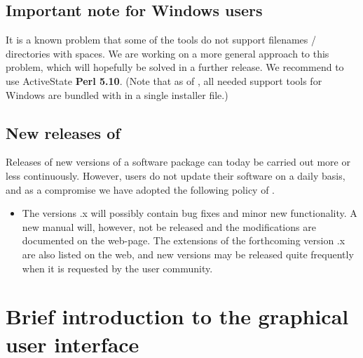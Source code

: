 \subsection{Important note for Windows users} 
It is a known problem that some of
the \MCS tools do not support filenames / directories with spaces.
We are working on a more general approach to this problem, which will
hopefully be solved in a further release. We recommend to use
ActiveState \textbf{Perl 5.10}. (Note that as of , all needed
support tools for Windows are bundled with \MCS in a single installer file.)

\subsection{New releases of \MCS}

Releases of new versions of a software package can today be carried out more or
less continuously. However, users do not update their software on a daily basis,
and as a compromise we have adopted the following policy of \MCS .

\begin{itemize}
\item The versions {\version}.x will possibly contain bug fixes and minor new
  functionality. A new manual will, however, not be released and the
  modifications are documented on the \MCS web-page. The extensions of the
  forthcoming version {\version}.x are also listed on the web, and new versions
  may be released quite frequently when it is requested by the user community.
\end{itemize}

\section{Brief introduction to the graphical user interface}
\label{s:brief}


